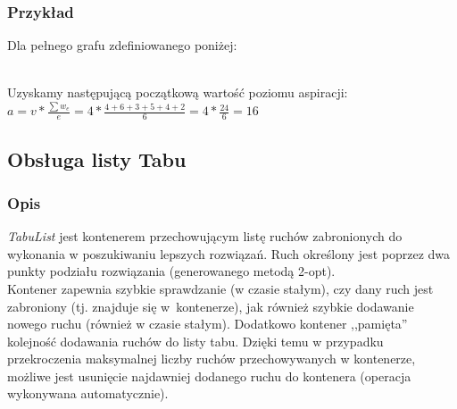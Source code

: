 \documentclass[11pt,a4paper]{article}
\begin{document}
\subsubsection{Przykład}
Dla pełnego grafu zdefiniowanego poniżej:\\

\\

\noindent Uzyskamy następującą początkową wartość poziomu aspiracji:\\
\begin{math}
  a = v * \frac{\sum w_e}{e} = 4 * \frac{4 + 6 + 3 + 5 + 4 + 2}{6} = 4 * \frac{24}{6} = 16
\end{math}

\subsection{Obsługa listy Tabu}
\label{subsec:tabu}
\subsubsection{Opis}
\textit{TabuList} jest kontenerem przechowującym listę ruchów zabronionych do wykonania w poszukiwaniu lepszych rozwiązań. Ruch określony jest poprzez dwa punkty podziału rozwiązania (generowanego metodą 2-opt).\\

Kontener zapewnia szybkie sprawdzanie (w czasie stałym), czy dany ruch jest zabroniony (tj. znajduje się w~kontenerze), jak również szybkie dodawanie nowego ruchu (również w czasie stałym). Dodatkowo kontener ,,pamięta'' kolejność dodawania ruchów do listy tabu. Dzięki temu w przypadku przekroczenia maksymalnej liczby ruchów przechowywanych w kontenerze, możliwe jest usunięcie najdawniej dodanego ruchu do kontenera (operacja wykonywana automatycznie).\\
\end{document}
